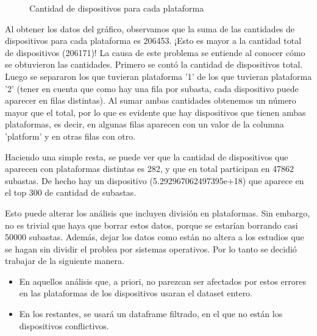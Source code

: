 \documentclass[a4paper, 12pt]{article}
\newcommand\tab[1][1cm]{\hspace*{#1}}
\begin{document}
	\FloatBarrier
		\begin{figure}
			\centering
		   	\caption{Cantidad de dispositivos para cada plataforma}
			\label{devicesporSO}
		\end{figure}
	\FloatBarrier

	\tab Al obtener los datos del gráfico, observamos que la suma de las cantidades de dispositivos para cada plataforma es 206453. ¡Esto es mayor a la cantidad total de dispositivos (206171)!\newline
	\tab La causa de este problema se entiende al conocer cómo se obtuvieron las cantidades. Primero se contó la cantidad de dispositivos total. Luego se separaron los que tuvieran plataforma '1' de los que tuvieran plataforma '2' (tener en cuenta que como hay una fila por subasta, cada dispositivo puede aparecer en filas distintas). Al sumar ambas cantidades obtenemos un número mayor que el total, por lo que es evidente que hay dispositivos que tienen ambas plataformas, es decir, en algunas filas aparecen con un valor de la columna 'platform' y en otras filas con otro.

	\tab Haciendo una simple resta, se puede ver que la cantidad de dispositivos que aparecen con plataformas distintas es 282, y que en total participan en 47862 subastas. De hecho hay un dispositivo (5.292967062497395e+18) que aparece en el top 300 de cantidad de subastas.

	\tab Esto puede alterar los análisis que incluyen división en plataformas. Sin embargo, no es trivial que haya que borrar estos datos, porque se estarían borrando casi 50000 subastas. Además, dejar los datos como están no altera a los estudios que se hagan sin dividir el problea por sistemas operativos. Por lo tanto se decidió trabajar de la siguiente manera.
	\begin{itemize}
		\item En aquellos análisis que, a priori, no parezcan ser afectados por estos errores en las plataformas de los dispositivos usaran el dataset entero.
		\item En los restantes, se usará un dataframe filtrado, en el que no están los dispositivos conflictivos.
	\end{itemize}
	
\end{document}
